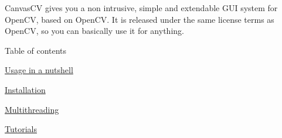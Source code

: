 Canvas\+CV gives you a non intrusive, simple and extendable G\+UI system for Open\+CV, based on Open\+CV. It is released under the same license terms as Open\+CV, so you can basically use it for anything.

Table of contents
\begin{DoxyItemize}
\item \hyperlink{nutshell}{Usage in a nutshell}
\item \hyperlink{install}{Installation}
\item \hyperlink{multithreading}{Multithreading}
\item \hyperlink{tutorials}{Tutorials} 
\end{DoxyItemize}